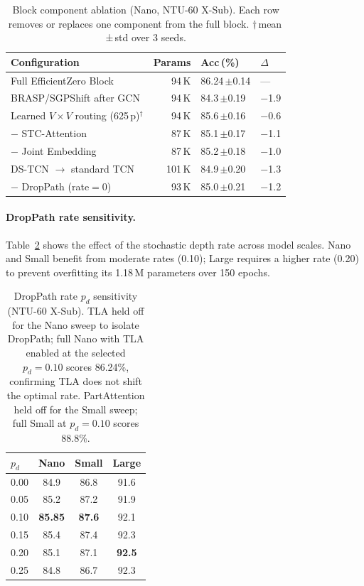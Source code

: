 \documentclass[sigconf,screen,review,anonymous]{acmart}
\newcommand{\best}[1]{{\color{bestcol}\textbf{#1}}}
\begin{document}
\begin{table}[t]
\centering
\caption{Block component ablation (Nano, NTU-60 X-Sub).
  Each row removes or replaces one component from the full block.
  $\dagger$\,mean\,±\,std over 3 seeds.}
\label{tab:block_comp}
\setlength{\tabcolsep}{4pt}
\begin{tabular}{lrll}
\toprule
Configuration & Params & Acc\,(\%) & $\Delta$ \\
\midrule
Full EfficientZero Block & 94\,K & 86.24\,${\pm}$0.14 & --- \\
BRASP/SGPShift after GCN & 94\,K & 84.3\,${\pm}$0.19 & $-$1.9 \\
Learned $V{\times}V$ routing (625\,p)$^\dagger$ & 94\,K & 85.6\,${\pm}$0.16 & $-$0.6 \\
$-$ STC-Attention        & 87\,K & 85.1\,${\pm}$0.17 & $-$1.1 \\
$-$ Joint Embedding      & 87\,K & 85.2\,${\pm}$0.18 & $-$1.0 \\
DS-TCN $\to$ standard TCN & 101\,K & 84.9\,${\pm}$0.20 & $-$1.3 \\
$-$ DropPath (rate$=$0)  & 93\,K & 85.0\,${\pm}$0.21 & $-$1.2 \\
\bottomrule
\end{tabular}
\vspace{-3mm}\end{table}

\paragraph{DropPath rate sensitivity.}
Table~\ref{tab:droppath} shows the effect of the stochastic depth rate
across model scales.
Nano and Small benefit from moderate rates (0.10); Large requires a
higher rate (0.20) to prevent overfitting its 1.18\,M parameters over
150 epochs.

\begin{table}[t]
\centering
\caption{DropPath rate $p_d$ sensitivity (NTU-60 X-Sub). TLA held off for the Nano sweep to isolate DropPath; full Nano with TLA enabled at the selected $p_d{=}0.10$ scores 86.24\%, confirming TLA does not shift the optimal rate. PartAttention held off for the Small sweep; full Small at $p_d{=}0.10$ scores 88.8\%.}
\label{tab:droppath}
\setlength{\tabcolsep}{5pt}
\begin{tabular}{lccc}
\toprule
$p_d$ & Nano & Small & Large \\
\midrule
0.00 & 84.9 & 86.8 & 91.6 \\
0.05 & 85.2 & 87.2 & 91.9 \\
0.10 & \best{85.85} & \best{87.6} & 92.1 \\
0.15 & 85.4 & 87.4 & 92.3 \\
0.20 & 85.1 & 87.1 & \best{92.5} \\
0.25 & 84.8 & 86.7 & 92.3 \\
\bottomrule
\end{tabular}
\vspace{-3mm}\end{table}
\end{document}
